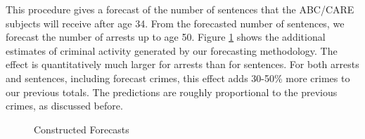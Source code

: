 \noindent This procedure gives a forecast of the number of sentences that the ABC/CARE subjects will receive after age 34. From the forecasted number of sentences, we forecast the number of arrests up to age 50. Figure \ref{fig:predictions} shows the additional estimates of criminal activity generated by our forecasting methodology. The effect is quantitatively much larger for arrests than for sentences. For both arrests and sentences, including forecast crimes, this effect adds 30-50\% more crimes to our previous totals. The predictions are roughly proportional to the previous crimes, as discussed before.

\begin{figure}[H]
\caption{Constructed Forecasts}
\centering \label{fig:predictions}
{}
\end{figure}

